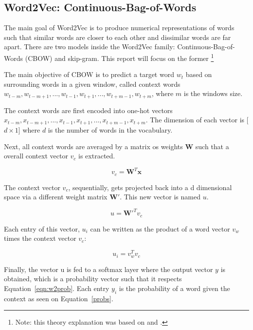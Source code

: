 \subsection{Word2Vec: Continuous-Bag-of-Words}

The main goal of Word2Vec is to produce numerical representations of words such that similar words are closer to each other and dissimilar words are far apart. There are two models inside the Word2Vec family: Continuous-Bag-of-Words (CBOW) and skip-gram. This report will focus on the former \footnote{Note: this theory explanation was based on \citep{ghodsi20171} and \citep{ghodsi20172}.}

The main objective of CBOW is to predict a target word  $w_t$ based on surrounding words in a given window, called context words $w_{t-m}, w_{t-m + 1}, ... ,w_{t-1}, w_{t+1}, ..., w_{t+m-1}, w_{t+m}$, where $m$ is the windows size.

The context words are first encoded into one-hot vectors $x_{t-m}, x_{t-m + 1}, ... ,x_{t-1}, x_{t+1}, ..., x_{t+m-1}, x_{t+m}$. The dimension of each vector is [$d \times1$] where $d$ is the number of words in the vocabulary.

Next, all context words are averaged by a  matrix os weights $\mathbf{W}$ such that a overall context vector $v_c$ is extracted.
 
\begin{equation}
	\label{eqn:hidden}
	v_c= \mathbf{W}^T \mathbf{x}
\end{equation}

The context vector $v_c$, sequentially, gets projected back into a d dimensional space via a different weight matrix $\mathbf{W'}$. This new vector is named $u$. 

\begin{equation}
	\label{eqn:hidden2}
	u = \mathbf{W'}^T v_c
\end{equation}

Each entry of this vector, $u_i$ can be written as the product of a word vector $v_w$ times the context vector $v_c$:

\begin{equation}
	\label{eqn:hidden3}
	u_i = v_w^T v_c
\end{equation}

Finally, the vector u is fed to a softmax layer where the output vector $y$ is obtained, which is a probability vector such that it respects Equation~\ref{eqn:w2prob}. Each entry $y_i$ is the probability of a word given the context as seen on Equation~\ref{probs}.


